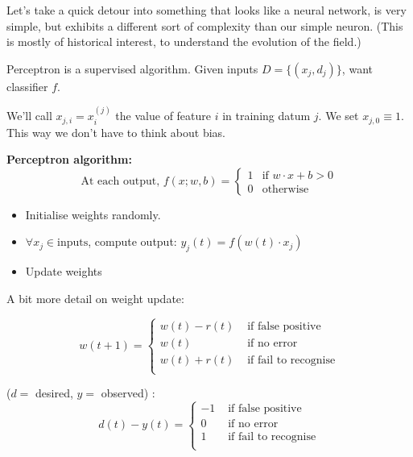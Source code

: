 
\usepackage{epsfig}





Let's take a quick detour into something that looks like a neural
network, is very simple, but exhibits a different sort of complexity
than our simple neuron.  (This is mostly of historical interest, to
understand the evolution of the field.)

Perceptron is a supervised algorithm.  Given inputs
$D = \{(x_j, d_j)\}$, want classifier $f$.

We'll call $x_{j,i} = x^{(j)}_i$ the value of feature $i$ in training datum $j$.
We set $x_{j,0}\equiv 1$.  This way we don't have to think about bias.

\textbf{Perceptron algorithm:}
\begin{displaymath}
  \mbox{At each output, }
  f(x; w, b) = \left\{
    \begin{array}{ll}
      1 & \mbox{if } w\cdot x + b > 0 \\
      0 & \mbox{otherwise}
    \end{array}
 \right.
\end{displaymath}
\begin{itemize}
\item Initialise weights randomly.
\item $\forall x_j\in \mbox{inputs}$, compute output: $y_j(t) = f(w(t)\cdot x_j)$
\item Update weights
\end{itemize}

A bit more detail on weight update:

\begin{displaymath}
w(t+1) = \left\{
\begin{array}{ll}
  w(t) - r(t) & \mbox{ if false positive} \\
  w(t) & \mbox{ if no error} \\
  w(t) + r(t) & \mbox{ if fail to recognise} \\
\end{array} \right.
\end{displaymath}

 ($d=$ desired, $y=$ observed) :
\begin{displaymath}
  d(t) - y(t) = \left\{
\begin{array}{ll}
  -1 & \mbox{ if  false positive} \\
  0 & \mbox{ if no error} \\
  1 & \mbox{ if fail to recognise} \\
\end{array} \right.
\end{displaymath}

